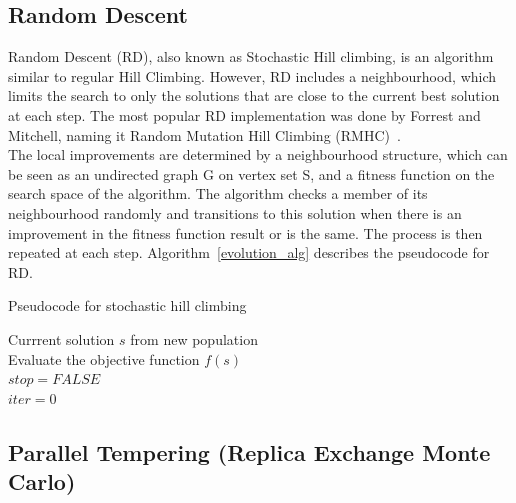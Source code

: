 \subsection{Random Descent} 

Random Descent (RD), also known as Stochastic Hill climbing, is an algorithm similar to regular Hill Climbing. However, RD includes a neighbourhood, which limits the search to only the solutions that are close to the current best solution at each step. The most popular RD implementation was done by Forrest and Mitchell, naming it Random Mutation Hill Climbing (RMHC)~\cite{mitchell1994will}.\\

The local improvements are determined by a neighbourhood structure, which can be seen as an undirected graph G on vertex set S, and a fitness function on the search space of the algorithm. The algorithm checks a member of its neighbourhood randomly and transitions to this solution when there is an improvement in the fitness function result or is the same. The process is then repeated at each step.%
%
Algorithm~\ref{evolution_alg} describes the pseudocode for RD.

\begin{algorithm}[H]
\caption{Pseudocode for stochastic hill climbing}
\label{evolution_alg}
\SetAlgoLined
    Currrent solution $s$ from new population\;\\
    Evaluate the objective function $f(s)$\;\\
    $stop = \textit{FALSE}$\;\\
    $iter = 0$\;\\
\end{algorithm}

\subsection{Parallel Tempering (Replica Exchange Monte Carlo)} 

